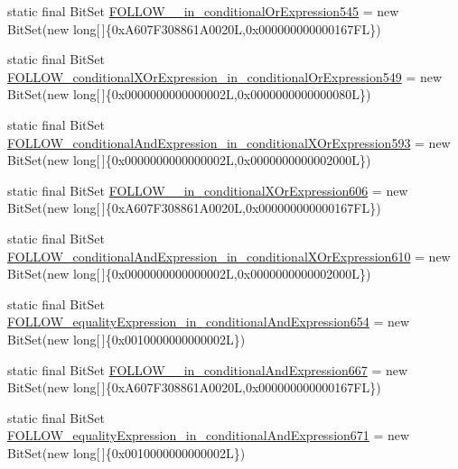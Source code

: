 \begin{DoxyCompactItemize}
\item 
static final Bit\-Set \hyperlink{classorg_1_1tzi_1_1use_1_1parser_1_1ocl_1_1_o_c_l_parser_a5be0afc18bc43dd574e5571fc8ba5467}{F\-O\-L\-L\-O\-W\-\_\-\_\-in\-\_\-conditional\-Or\-Expression545} = new Bit\-Set(new long\mbox{[}$\,$\mbox{]}\{0x\-A607\-F308861\-A0020\-L,0x000000000000167\-F\-L\})
\item 
static final Bit\-Set \hyperlink{classorg_1_1tzi_1_1use_1_1parser_1_1ocl_1_1_o_c_l_parser_a784ac31c0971df674aefe5cf67b20762}{F\-O\-L\-L\-O\-W\-\_\-conditional\-X\-Or\-Expression\-\_\-in\-\_\-conditional\-Or\-Expression549} = new Bit\-Set(new long\mbox{[}$\,$\mbox{]}\{0x0000000000000002\-L,0x0000000000000080\-L\})
\item 
static final Bit\-Set \hyperlink{classorg_1_1tzi_1_1use_1_1parser_1_1ocl_1_1_o_c_l_parser_a662c69c296650a793510225c77f6da2f}{F\-O\-L\-L\-O\-W\-\_\-conditional\-And\-Expression\-\_\-in\-\_\-conditional\-X\-Or\-Expression593} = new Bit\-Set(new long\mbox{[}$\,$\mbox{]}\{0x0000000000000002\-L,0x0000000000002000\-L\})
\item 
static final Bit\-Set \hyperlink{classorg_1_1tzi_1_1use_1_1parser_1_1ocl_1_1_o_c_l_parser_aa6d113eeaa4af21efff7e81d6d648dac}{F\-O\-L\-L\-O\-W\-\_\-\_\-in\-\_\-conditional\-X\-Or\-Expression606} = new Bit\-Set(new long\mbox{[}$\,$\mbox{]}\{0x\-A607\-F308861\-A0020\-L,0x000000000000167\-F\-L\})
\item 
static final Bit\-Set \hyperlink{classorg_1_1tzi_1_1use_1_1parser_1_1ocl_1_1_o_c_l_parser_aa8557fd2406d5d754ab160beb309c3c1}{F\-O\-L\-L\-O\-W\-\_\-conditional\-And\-Expression\-\_\-in\-\_\-conditional\-X\-Or\-Expression610} = new Bit\-Set(new long\mbox{[}$\,$\mbox{]}\{0x0000000000000002\-L,0x0000000000002000\-L\})
\item 
static final Bit\-Set \hyperlink{classorg_1_1tzi_1_1use_1_1parser_1_1ocl_1_1_o_c_l_parser_a081c12d99fbfd3845c8daceeff30ca3b}{F\-O\-L\-L\-O\-W\-\_\-equality\-Expression\-\_\-in\-\_\-conditional\-And\-Expression654} = new Bit\-Set(new long\mbox{[}$\,$\mbox{]}\{0x0010000000000002\-L\})
\item 
static final Bit\-Set \hyperlink{classorg_1_1tzi_1_1use_1_1parser_1_1ocl_1_1_o_c_l_parser_abbffd6d53ebd93891f66cf5426005a24}{F\-O\-L\-L\-O\-W\-\_\-\_\-in\-\_\-conditional\-And\-Expression667} = new Bit\-Set(new long\mbox{[}$\,$\mbox{]}\{0x\-A607\-F308861\-A0020\-L,0x000000000000167\-F\-L\})
\item 
static final Bit\-Set \hyperlink{classorg_1_1tzi_1_1use_1_1parser_1_1ocl_1_1_o_c_l_parser_a06b1e8335b5dac2aea04707bc69ae384}{F\-O\-L\-L\-O\-W\-\_\-equality\-Expression\-\_\-in\-\_\-conditional\-And\-Expression671} = new Bit\-Set(new long\mbox{[}$\,$\mbox{]}\{0x0010000000000002\-L\})

\end{DoxyCompactItemize}
